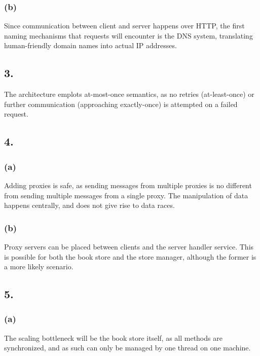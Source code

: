 \documentclass[12pt]{article}
\begin{document}
\subsubsection*{(b)} %

Since communication between client and server happens over HTTP, the first naming mechanisms that requests will encounter is the DNS system, translating human-friendly domain names into actual IP addresses.

\subsection*{3.} %

The architecture emplots at-most-once semantics, as no retries (at-least-once) or further communication (approaching exactly-once) is attempted on a failed request.

\subsection*{4.} %

\subsubsection*{(a)} %

Adding proxies is safe, as sending messages from multiple proxies is no different from sending multiple messages from a single proxy. The manipulation of data happens centrally, and does not give rise to data races.

\subsubsection*{(b)} %

Proxy servers can be placed between clients and the server handler service. This is possible for both the book store and the store manager, although the former is a more likely scenario.

\subsection*{5.} %

\subsubsection*{(a)} %

The scaling bottleneck will be the book store itself, as all methods are synchronized, and as such can only be managed by one thread on one machine.
\end{document}
